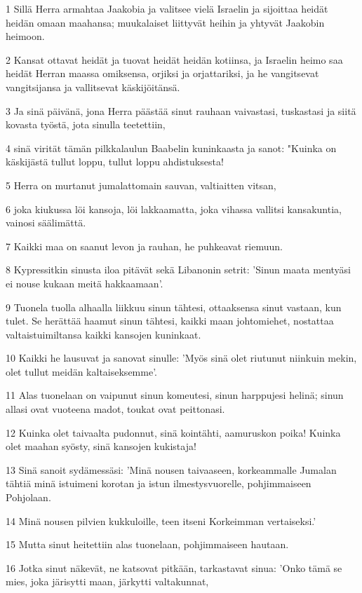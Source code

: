 \par 1 Sillä Herra armahtaa Jaakobia ja valitsee vielä Israelin ja sijoittaa heidät heidän omaan maahansa; muukalaiset liittyvät heihin ja yhtyvät Jaakobin heimoon.
\par 2 Kansat ottavat heidät ja tuovat heidät heidän kotiinsa, ja Israelin heimo saa heidät Herran maassa omiksensa, orjiksi ja orjattariksi, ja he vangitsevat vangitsijansa ja vallitsevat käskijöitänsä.
\par 3 Ja sinä päivänä, jona Herra päästää sinut rauhaan vaivastasi, tuskastasi ja siitä kovasta työstä, jota sinulla teetettiin,
\par 4 sinä virität tämän pilkkalaulun Baabelin kuninkaasta ja sanot: "Kuinka on käskijästä tullut loppu, tullut loppu ahdistuksesta!
\par 5 Herra on murtanut jumalattomain sauvan, valtiaitten vitsan,
\par 6 joka kiukussa löi kansoja, löi lakkaamatta, joka vihassa vallitsi kansakuntia, vainosi säälimättä.
\par 7 Kaikki maa on saanut levon ja rauhan, he puhkeavat riemuun.
\par 8 Kypressitkin sinusta iloa pitävät sekä Libanonin setrit: 'Sinun maata mentyäsi ei nouse kukaan meitä hakkaamaan'.
\par 9 Tuonela tuolla alhaalla liikkuu sinun tähtesi, ottaaksensa sinut vastaan, kun tulet. Se herättää haamut sinun tähtesi, kaikki maan johtomiehet, nostattaa valtaistuimiltansa kaikki kansojen kuninkaat.
\par 10 Kaikki he lausuvat ja sanovat sinulle: 'Myös sinä olet riutunut niinkuin mekin, olet tullut meidän kaltaiseksemme'.
\par 11 Alas tuonelaan on vaipunut sinun komeutesi, sinun harppujesi helinä; sinun allasi ovat vuoteena madot, toukat ovat peittonasi.
\par 12 Kuinka olet taivaalta pudonnut, sinä kointähti, aamuruskon poika! Kuinka olet maahan syösty, sinä kansojen kukistaja!
\par 13 Sinä sanoit sydämessäsi: 'Minä nousen taivaaseen, korkeammalle Jumalan tähtiä minä istuimeni korotan ja istun ilmestysvuorelle, pohjimmaiseen Pohjolaan.
\par 14 Minä nousen pilvien kukkuloille, teen itseni Korkeimman vertaiseksi.'
\par 15 Mutta sinut heitettiin alas tuonelaan, pohjimmaiseen hautaan.
\par 16 Jotka sinut näkevät, ne katsovat pitkään, tarkastavat sinua: 'Onko tämä se mies, joka järisytti maan, järkytti valtakunnat,
